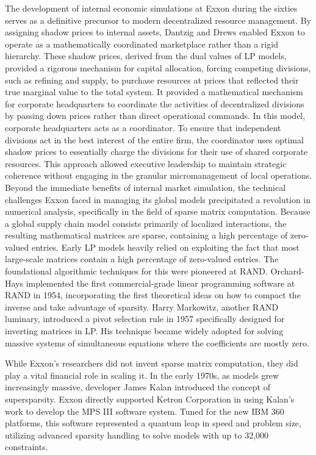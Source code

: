 The development of internal economic simulations at Exxon during the sixties serves as a definitive precursor to modern decentralized resource management. By assigning shadow prices to internal assets, Dantzig and Drews enabled Exxon to operate as a mathematically coordinated marketplace rather than a rigid hierarchy. These shadow prices, derived from the dual values of LP models, provided a rigorous mechanism for capital allocation, forcing competing divisions, such as refining and supply, to purchase resources at prices that reflected their true marginal value to the total system. It provided a mathematical mechanism for corporate headquarters to coordinate the activities of decentralized divisions by passing down prices rather than direct operational commands. In this model, corporate headquarters acts as a coordinator. To ensure that independent divisions act in the best interest of the entire firm, the coordinator uses optimal shadow prices to essentially charge the divisions for their use of shared corporate resources. This approach allowed executive leadership to maintain strategic coherence without engaging in the granular micromanagement of local operations. 
Beyond the immediate benefits of internal market simulation, the technical challenges Exxon faced in managing its global models precipitated a revolution in numerical analysis, specifically in the field of sparse matrix computation. Because a global supply chain model consists primarily of localized interactions, the resulting mathematical matrices are sparse, containing a high percentage of zero-valued entries. Early LP models heavily relied on exploiting the fact that most large-scale matrices contain a high percentage of zero-valued entries. The foundational algorithmic techniques for this were pioneered at RAND. Orchard-Hays implemented the first commercial-grade linear programming software at RAND in 1954, incorporating the first theoretical ideas on how to compact the inverse and take advantage of sparsity. Harry Markowitz, another RAND luminary, introduced a pivot selection rule in 1957 specifically designed for inverting matrices in LP. His technique became widely adopted for solving massive systems of simultaneous equations where the coefficients are mostly zero. 

While Exxon's researchers did not invent sparse matrix computation, they did play a vital financial role in scaling it. In the early 1970s, as models grew increasingly massive, developer James Kalan introduced the concept of supersparsity. Exxon directly supported Ketron Corporation in using Kalan's work to develop the MPS III software system. Tuned for the new IBM 360 platforms, this software represented a quantum leap in speed and problem size, utilizing advanced sparsity handling to solve models with up to 32,000 constraints.

